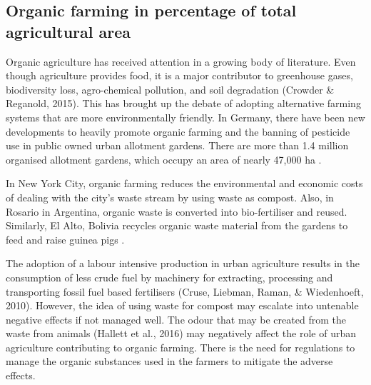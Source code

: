 \subsection{Organic farming in percentage of total agricultural area}

Organic agriculture has received attention in a growing body of literature. Even though agriculture provides food, it is a major contributor to greenhouse gases, biodiversity loss, agro-chemical pollution, and soil degradation (Crowder \& Reganold, 2015). This has brought up the debate of adopting alternative farming systems that are more environmentally friendly. In Germany, there have been new developments to heavily promote organic farming and the banning of pesticide use in public owned urban allotment gardens. There are more than 1.4 million organised allotment gardens, which occupy an area of nearly 47,000 ha \cite{Hoornweg2012}.

In New York City, organic farming reduces the environmental and economic costs of dealing with the city's waste stream by using waste as compost. Also, in Rosario in Argentina, organic waste is converted into bio-fertiliser and reused. Similarly, El Alto, Bolivia recycles organic waste material from the gardens to feed and raise guinea pigs \cite{Hoornweg2012}.

The adoption of a labour intensive production in urban agriculture results in the consumption of less crude fuel by machinery for extracting, processing and transporting fossil fuel based fertilisers (Cruse, Liebman, Raman, \& Wiedenhoeft, 2010). However, the idea of using waste for compost may escalate into untenable negative effects if not managed well. The odour that may be created from the waste from animals (Hallett et al., 2016) may negatively affect the role of urban agriculture contributing to organic farming. There is the need for regulations to manage the organic substances used in the farmers to mitigate the adverse effects.


